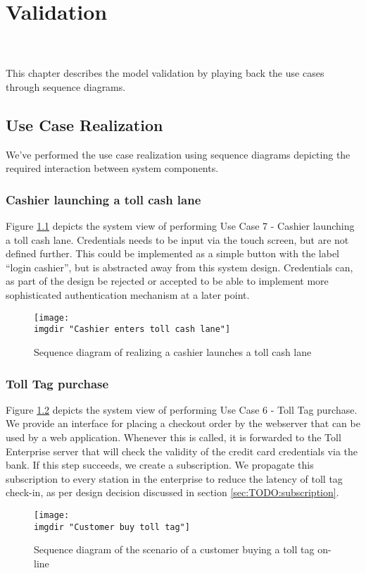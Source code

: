 \chapter{Validation}
\kim\\\\
This chapter describes the model validation by playing back the use cases through sequence diagrams.
\section{Use Case Realization}
We've performed the use case realization using sequence diagrams depicting the required interaction between system components.
\subsection{Cashier launching a toll cash lane}
Figure \ref{fig:seq_diag:launches_a_toll_cash_lane} depicts the system view of performing Use Case 7 - Cashier launching a toll cash lane. Credentials needs to be input via the touch screen, but are not defined further. This could be implemented as a simple button with the label ``login cashier'', but is abstracted away from this system design. Credentials can, as part of the design be rejected or accepted to be able to implement more sophisticated authentication mechanism at a later point.
\begin{figure} %
  \texttt{[image: \\imgdir "Cashier enters toll cash lane"]}
  \caption{Sequence diagram of realizing a cashier launches a toll cash lane}
  \label{fig:seq_diag:launches_a_toll_cash_lane}
\end{figure}

\subsection{Toll Tag purchase}
Figure \ref{fig:seq_diag:customer_orders_toll_tag_online} depicts the system view of performing Use Case 6 - Toll Tag purchase. We provide an interface for placing a checkout order by the webserver that can be used by a web application. Whenever this is called, it is forwarded to the Toll Enterprise server that will check the validity of the credit card credentials via the bank. If this step succeeds, we create a subscription. We propagate this subscription to every station in the enterprise to reduce the latency of toll tag check-in, as per design decision discussed in section \ref{sec:TODO:subscription}.
\begin{figure} %
  \texttt{[image: \\imgdir "Customer buy toll tag"]}
  \caption{Sequence diagram of the scenario of a customer buying a toll tag on-line}
  \label{fig:seq_diag:customer_orders_toll_tag_online}
\end{figure}

